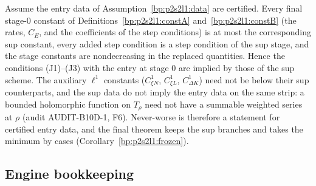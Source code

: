 \begin{lemma}\label{bp:p2s2l1:never-worse}
Assume the entry data of Assumption~\ref{bp:p2s2l1:data} are certified. Every final stage-$0$ constant of Definitions~\ref{bp:p2s2l1:constA}
and~\ref{bp:p2s2l1:constB} (the rates, $C_E$, and the coefficients of the step conditions) is at most the corresponding sup constant, every added step
condition is a step condition of the sup stage, and the stage constants are nondecreasing in the replaced quantities. Hence the conditions
(J1)--(J3) with the entry at stage $0$ are implied by those of the sup scheme. The auxiliary $\ell^1$ constants ($C^1_{\xi N}$, $C^1_{\xi L}$, $C^1_{\Delta K}$)
need not be below their sup counterparts, and the sup data do not imply the entry data on the same strip: a bounded holomorphic function on
$T_\rho$ need not have a summable weighted series at $\rho$ (audit AUDIT-B10D-1, F6). Never-worse is therefore a statement for certified entry data,
and the final theorem keeps the sup branches and takes the minimum by cases (Corollary~\ref{bp:p2s2l1:frozen}).
\end{lemma}

\subsection{Engine bookkeeping}\label{bp:p2s2l1:sec-engine}

